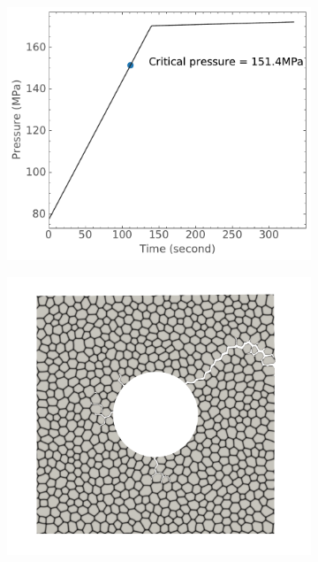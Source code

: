 \begin{figure}[htb!]
  \begin{subfigure}[t]{0.3\linewidth}
    \centering
    \includegraphics[width=\linewidth]{Chapter3/figures/bubble_pressure_r0.5_ext60_rod196}
    \caption{}
  \end{subfigure}
  \begin{subfigure}[t]{0.3\linewidth}
    \centering
    \includegraphics[width=\linewidth]{Chapter3/figures/r5_ext60}
    \caption{}
  \end{subfigure}

\end{figure}
